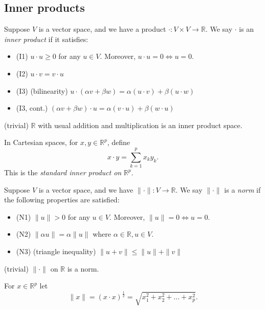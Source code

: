 \subsection{Inner products}

\begin{definition}
	Suppose $V$ is a vector space, and we have a product $\cdot: V \times V \to \mathbb{R}$.
	We say $\cdot$ is an \textit{inner product} if it satisfies:
	\begin{itemize}
		\item (I1) $u \cdot u \ge 0$ for any $u \in V$. Moreover, $u \cdot u = 0 \iff u = 0$.
		\item (I2) $u\cdot v = v \cdot u$ 
		\item (I3) (bilinearity) $u \cdot (\alpha v + \beta w) = \alpha(u \cdot v) + \beta (u \cdot w)$
		\item (I3, cont.) $ (\alpha v + \beta w) \cdot u = \alpha(v \cdot u) + \beta (w \cdot u)$
	\end{itemize}
\end{definition}

\begin{example}
	(trivial) $\mathbb{R}$ with usual addition and multiplication is an inner product space.
\end{example}

In Cartesian spaces, for $x, y \in \mathbb{R}^p$, define
\[
	x \cdot y = \sum_{k=1}^{p} x_k y_k
.\] 
This is the \textit{standard inner product on} $\mathbb{R}^p$.

\begin{definition}[Norm]
	Suppose $V$ is a vector space, and we have $\|\cdot\|: V \to \mathbb{R}$. We say $\|\cdot\|$ is a \textit{norm} if the following properties are satisfied:
	\begin{itemize}
		\item (N1) $\|u\|>0$ for any $u \in V$. Moreover, $\|u\|=0 \iff u=0$.
		\item (N2) $\|\alpha u\| = \alpha \|u\|$ where $\alpha \in \mathbb{R}, u \in V$.
		\item (N3) (triangle inequality) $\|u+v\|\le   \|u\|+\|v\|$
	\end{itemize}
\end{definition}

\begin{example}
	(trivial) $\|\cdot\| $ on $\mathbb{R}$ is a norm.
\end{example}

\begin{example}
	For $x \in \mathbb{R}^p$ let \[
		\|x\| = \left( x \cdot x \right) ^{\frac{1}{2}} = \sqrt{x_1^2 + x_2^2 + \ldots + x_p^2} 
	.\] 
\end{example}

